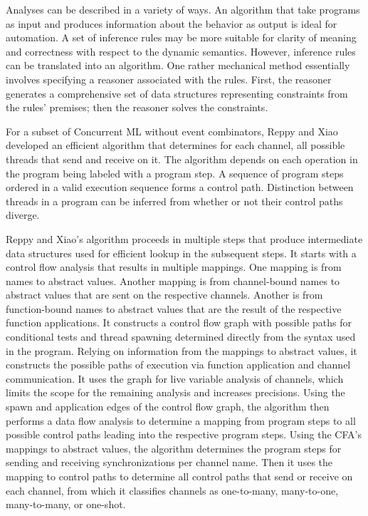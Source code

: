 \documentclass[letterpaper, 11pt]{extarticle}
\begin{document}
Analyses can be described in a variety of ways. An algorithm that take programs
as input and produces information about the behavior as output is ideal for automation. A
set of inference rules may be more suitable for clarity of meaning and correctness 
with respect to the dynamic semantics. 
However, inference rules can be translated into an algorithm.
One rather mechanical method essentially involves specifying a reasoner associated with the rules. 
First, the reasoner generates a comprehensive set of data structures representing
constraints from the rules' premises; then the reasoner solves the constraints.

For a subset of Concurrent ML without event combinators, Reppy and Xiao developed an
efficient algorithm that determines for each channel, all possible threads that send
and receive on it. The algorithm depends on each operation in the program being
labeled with a program step. A sequence of program steps ordered in a valid execution
sequence forms a control path. Distinction between threads in a program can be inferred from
whether or not their control paths diverge.

Reppy and Xiao's algorithm proceeds in multiple steps that produce intermediate data structures used for
efficient lookup in the subsequent steps. It starts with a control flow analysis that
results in multiple mappings. One mapping is from names to abstract values.
Another mapping is from channel-bound names to abstract values that are
sent on the respective channels. Another is from function-bound names to abstract values
that are the result of the respective function applications. It constructs a control flow graph 
with possible paths for conditional tests and thread spawning determined directly from the
syntax used in the program. Relying on information from the mappings to abstract values,
it constructs the possible paths of execution via function application and channel
communication. It uses the graph for live variable analysis of channels, which limits the
scope for the remaining analysis and increases precisions. 
Using the spawn and application edges of the control flow
graph, the algorithm then performs a data flow analysis to determine a mapping from program
steps to all possible control paths leading into the respective program steps. Using the
CFA's mappings to abstract values, the algorithm determines the program steps for sending and
receiving synchronizations per channel name. Then it uses the mapping to control paths to determine all
control paths that send or receive on each channel, from which it classifies channels as
one-to-many, many-to-one, many-to-many, or one-shot.
\end{document}
